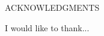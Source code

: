 \newpage
\thispagestyle{empty}

\begin{center}
  ACKNOWLEDGMENTS      
\end{center}

I would like to thank...

\thispagestyle{empty}
\vfill
